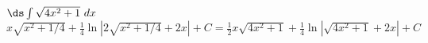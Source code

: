 {$\ds \int \sqrt{4x^2+1}\ dx$
}
{$x\sqrt{x^2+1/4}+\frac14\ln|2\sqrt{x^2+1/4}+2x| + C = \frac12x\sqrt{4x^2+1}+\frac14\ln|\sqrt{4x^2+1}+2x|+C$
}